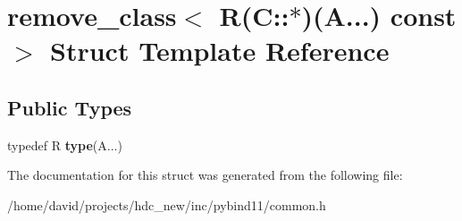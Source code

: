 \hypertarget{structremove__class_3_01_r_07_c_1_1_5_08_07_a_8_8_8_08_01const_01_01_4}{}\section{remove\+\_\+class$<$ R(C\+:\+:$\ast$)(A...) const $>$ Struct Template Reference}
\label{structremove__class_3_01_r_07_c_1_1_5_08_07_a_8_8_8_08_01const_01_01_4}
\subsection*{Public Types}
\begin{DoxyCompactItemize}
\item 
typedef R {\bfseries type}(A...)\hypertarget{structremove__class_3_01_r_07_c_1_1_5_08_07_a_8_8_8_08_01const_01_01_4_abc7adb03afbaca4dd9b38b6cb8067c63}{}\label{structremove__class_3_01_r_07_c_1_1_5_08_07_a_8_8_8_08_01const_01_01_4_abc7adb03afbaca4dd9b38b6cb8067c63}

\end{DoxyCompactItemize}


The documentation for this struct was generated from the following file\+:\begin{DoxyCompactItemize}
\item 
/home/david/projects/hdc\+\_\+new/inc/pybind11/common.\+h\end{DoxyCompactItemize}
